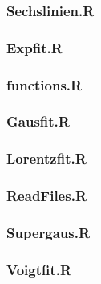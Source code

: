 \subsubsection*{Sechslinien.R}\label{sechslinien}


\subsubsection*{Expfit.R}\label{exp}


\subsubsection*{functions.R}\label{functions}


\subsubsection*{Gausfit.R}\label{gaus}


\subsubsection*{Lorentzfit.R}\label{lorentzfit}


\subsubsection*{ReadFiles.R}\label{Read}


\subsubsection*{Supergaus.R}\label{supergaus}


\subsubsection*{Voigtfit.R}\label{voigtfit}


